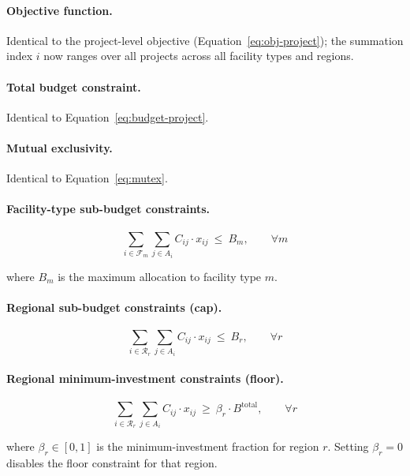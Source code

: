 \paragraph{Objective function.} Identical to the project-level objective
(Equation~\ref{eq:obj-project}); the summation index $i$ now ranges over all
projects across all facility types and regions.

\paragraph{Total budget constraint.} Identical to
Equation~\ref{eq:budget-project}.

\paragraph{Mutual exclusivity.} Identical to Equation~\ref{eq:mutex}.

\paragraph{Facility-type sub-budget constraints.}
\begin{equation}
\sum_{i \in \mathcal{F}_m} \sum_{j \in A_i} C_{ij} \cdot x_{ij}\ \leq\ B_m,
\qquad \forall m
\label{eq:budget-facility}
\end{equation}

\noindent where $B_m$ is the maximum allocation to facility type $m$.

\paragraph{Regional sub-budget constraints (cap).}
\begin{equation}
\sum_{i \in \mathcal{R}_r} \sum_{j \in A_i} C_{ij} \cdot x_{ij}\ \leq\ B_r,
\qquad \forall r
\label{eq:budget-region-cap}
\end{equation}

\paragraph{Regional minimum-investment constraints (floor).}
\begin{equation}
\sum_{i \in \mathcal{R}_r} \sum_{j \in A_i} C_{ij} \cdot x_{ij}\ \geq\ \beta_r \cdot B^{\mathrm{total}},
\qquad \forall r
\label{eq:budget-region-floor}
\end{equation}

\noindent where $\beta_r \in [0, 1]$ is the minimum-investment fraction for
region $r$. Setting $\beta_r = 0$ disables the floor constraint for that
region.

